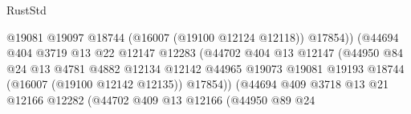 \begin{lexlean}{RustStd}
\begin{coremodule}
                                                  @19081
                                                  @19097
                                                  @18744
                                                  (@16007 (@19100 @12124 @12118))
                                                  @17854))
                                              (@44694
                                                @404
                                                @3719
                                                @13
                                                @22
                                                @12147
                                                @12283
                                                (@44702
                                                  @404
                                                  @13
                                                  @12147
                                                  (@44950
                                                    @84
                                                    @24
                                                    @13
                                                    @4781
                                                    @4882
                                                    @12134
                                                    @12142
                                                    @44965
                                                    @19073
                                                    @19081
                                                    @19193
                                                    @18744
                                                    (@16007 (@19100 @12142 @12135))
                                                    @17854))
                                                (@44694
                                                  @409
                                                  @3718
                                                  @13
                                                  @21
                                                  @12166
                                                  @12282
                                                  (@44702
                                                    @409
                                                    @13
                                                    @12166
                                                    (@44950
                                                      @89
                                                      @24

\end{coremodule}
\end{lexlean}
